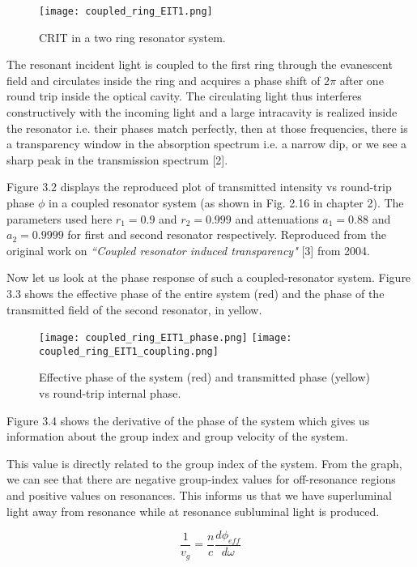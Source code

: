\begin{figure}[h]
\centering
\texttt{[image: coupled\_ring\_EIT1.png]}
\caption{CRIT in a two ring resonator system.}
\end{figure}


The resonant incident light is coupled to the first ring through the evanescent field and circulates inside the ring and acquires a phase shift of 2$\pi$ after one round trip inside the optical cavity. The circulating light thus interferes constructively with the incoming light and a large intracavity is realized inside the resonator i.e. their phases match perfectly, then at those frequencies, there is a transparency window in the absorption spectrum i.e. a narrow dip, or we see a sharp peak in the transmission spectrum [2].


Figure 3.2 displays the reproduced plot of transmitted intensity vs round-trip phase $\phi$ in a coupled resonator system (as shown in Fig. 2.16 in chapter 2). The parameters used here $r_{1} = 0.9$ and $r_{2} = 0.999$ and attenuations $a_{1} = 0.88$ and $a_{2} = 0.9999$ for first and second resonator respectively. Reproduced from the original work on \textit{``Coupled resonator induced transparency"} [3] from 2004.


Now let us look at the phase response of such a coupled-resonator system. Figure 3.3 shows the effective phase of the entire system (red) and the phase of the transmitted field of the second resonator, in yellow. 

\begin{figure}[h]
\texttt{[image: coupled\_ring\_EIT1\_phase.png]}
\texttt{[image: coupled\_ring\_EIT1\_coupling.png]}
\caption{Effective phase of the system (red) and transmitted phase (yellow) vs round-trip internal phase.}
\end{figure}

Figure 3.4 shows the derivative of the phase of the system which gives us information about the group index and group velocity of the system. 

This value is directly related to the group index of the system. From the graph, we can see that there are negative group-index values for off-resonance regions and positive values on resonances. This informs us that we have superluminal light away from resonance while at resonance subluminal light is produced. 

\begin{equation}
\frac{1}{v_{g}} = \frac{n}{c} \frac{d\phi_{eff}}{d\omega}
\end{equation}

